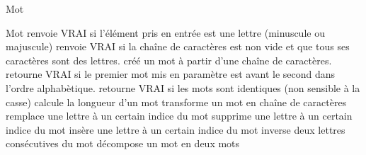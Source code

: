 \begin{tad}
	\tadDependances{\chaine, \naturelNonNul, \caractere, \booleen}
	\begin{tadOperations}{Mot}
			{\tadUnParam{\caractere}}%
			{\tadUnParam{\booleen}}
			{\tadUnParam{\chaine}}%
			{\tadUnParam{\booleen}}
			{\tadUnParam{\chaine}}%
			{}
			{}%
			{\tadUnParam{\booleen}}
			{}%
			{\tadUnParam{\booleen}}
			{}%
			{}
			{}%
			{\tadUnParam{\chaine}}
			{}%
			{}
			{}%
			{}
			{}%
			{}
			{}%
			{}
			{}%
			{}
	\end{tadOperations}
	
	\begin{tadSemantiques}{Mot}
			{renvoie VRAI si l'\'el\'ement pris en entr\'ee est une lettre (minuscule ou majuscule)}
			{renvoie VRAI si la chaîne de caract\`eres est non vide et que tous ses caract\`eres sont des lettres.}
			{cr\'e\'e un mot \`a partir d’une cha\^ine de caract\`eres.}
			{retourne VRAI si le premier mot mis en param\`etre est avant le second dans l'ordre alphab\`etique.}
			{retourne VRAI si les mots sont identiques (non sensible à la casse)}
			{calcule la longueur d'un mot}
			{transforme un mot en cha\^ine de caract\`eres}
			{remplace une lettre \`a un certain indice du mot}
			{supprime une lettre \`a un certain indice du mot}
			{ins\`ere une lettre \`a un certain indice du mot}
			{inverse deux lettres cons\'ecutives du mot}
			{décompose un mot en deux mots}
	\end{tadSemantiques}
	

\end{tad}
